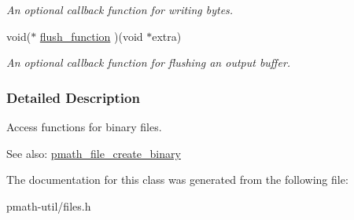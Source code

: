 \begin{CompactItemize}
\begin{CompactList}\small\item\em An optional callback function for writing bytes. \item\end{CompactList}\item 
\hypertarget{structpmath__binary__file__api__t_36e555e1ceec193b42ea3ba76e2c9b43}{
void($\ast$ \hyperlink{structpmath__binary__file__api__t_36e555e1ceec193b42ea3ba76e2c9b43}{flush\_\-function} )(void $\ast$extra)}
\label{structpmath__binary__file__api__t_36e555e1ceec193b42ea3ba76e2c9b43}

\begin{CompactList}\small\item\em An optional callback function for flushing an output buffer. \item\end{CompactList}\end{CompactItemize}


\subsubsection{Detailed Description}
Access functions for binary files. 

\begin{Desc}
\item[See also:]\hyperlink{group__file__api_g121e1c31d32fa30b60c8bb4d0808f4eb}{pmath\_\-file\_\-create\_\-binary} \end{Desc}


The documentation for this class was generated from the following file:\begin{CompactItemize}
\item 
pmath-util/files.h\end{CompactItemize}
